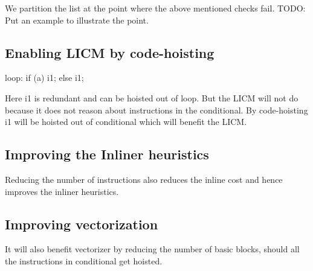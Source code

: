 \begin{section}
We partition the list at the point where the above mentioned checks fail.
TODO: Put an example to illustrate the point.

\section{Enabling LICM by code-hoisting}
loop:
if (a)
  i1;
else
  i1;

Here i1 is redundant and can be hoisted out of loop. But the LICM will
not do because it does not reason about instructions in the
conditional.  By code-hoisting i1 will be hoisted out of conditional
which will benefit the LICM.

\section{Improving the Inliner heuristics}
Reducing the number of instructions also reduces the inline cost and
hence improves the inliner heuristics.

\section{Improving vectorization}
It will also benefit vectorizer by reducing the number
of basic blocks, should all the instructions in conditional get hoisted.

\end{section}


